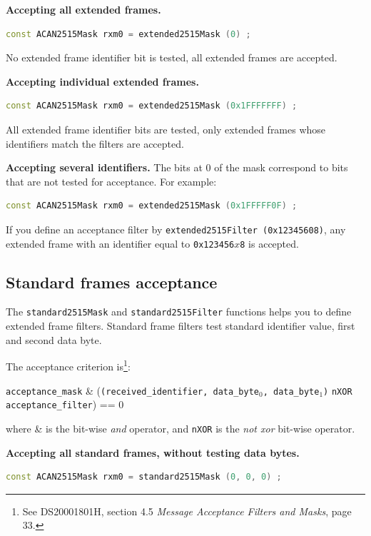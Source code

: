 \documentclass[10pt, a4paper, obeyspaces]{extarticle}
\begin{document}
{\bf Accepting all extended frames.}
{ \small\begin{lstlisting}[language=c++]
  const ACAN2515Mask rxm0 = extended2515Mask (0) ;
\end{lstlisting}}
No extended frame identifier bit is tested, all extended frames are accepted.

{\bf Accepting individual extended frames.}
{ \small\begin{lstlisting}[language=c++]
  const ACAN2515Mask rxm0 = extended2515Mask (0x1FFFFFFF) ;
\end{lstlisting}}
All extended frame identifier bits are tested, only extended frames whose identifiers match the filters are accepted.


{\bf Accepting several identifiers.}
The bits at 0 of the mask correspond to bits that are not tested for acceptance. For example:
{ \small\begin{lstlisting}[language=c++]
  const ACAN2515Mask rxm0 = extended2515Mask (0x1FFFFF0F) ;
\end{lstlisting}}

If you define an acceptance filter by \texttt{extended2515Filter (0x12345608)}, any extended frame with an identifier equal to \texttt{0x123456$x$8} is accepted.












\subsection{Standard frames acceptance}

The \texttt{standard2515Mask} and \texttt{standard2515Filter} functions helps you to define extended frame filters. Standard frame filters test standard identifier value, first and second data byte.

The acceptance criterion is\footnote{See DS20001801H, section 4.5 \emph{Message Acceptance Filters and Masks}, page 33.}:

\begin{center}\small
\texttt{acceptance\_mask} \& (\texttt{(received\_identifier, data\_byte$_0$, data\_byte$_1$)} \texttt{nXOR} \texttt{acceptance\_filter}) == 0
\end{center}
where \& is the bit-wise \emph{and} operator, and \texttt{nXOR} is the \emph{not xor} bit-wise operator.

{\bf Accepting all standard frames, without testing data bytes.}
{ \small\begin{lstlisting}[language=c++]
  const ACAN2515Mask rxm0 = standard2515Mask (0, 0, 0) ;
\end{lstlisting}}
\end{document}

